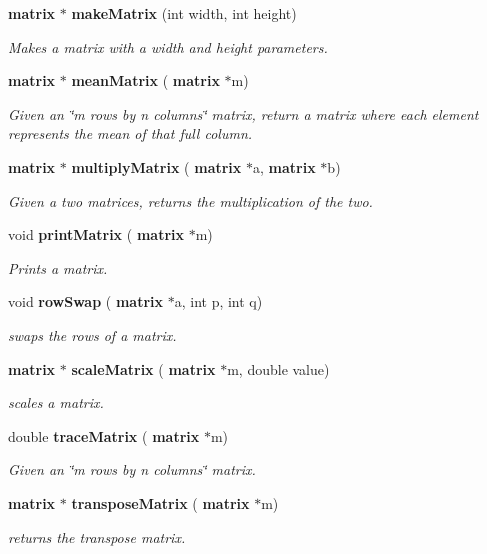 \begin{DoxyCompactItemize}
\textbf{ matrix} $\ast$ \textbf{ make\+Matrix} (int width, int height)
\begin{DoxyCompactList}\small\item\em Makes a matrix with a width and height parameters. \end{DoxyCompactList}\item 
\textbf{ matrix} $\ast$ \textbf{ mean\+Matrix} (\textbf{ matrix} $\ast$m)
\begin{DoxyCompactList}\small\item\em Given an \char`\"{}m rows by n columns\char`\"{} matrix, return a matrix where each element represents the mean of that full column. \end{DoxyCompactList}\item 
\textbf{ matrix} $\ast$ \textbf{ multiply\+Matrix} (\textbf{ matrix} $\ast$a, \textbf{ matrix} $\ast$b)
\begin{DoxyCompactList}\small\item\em Given a two matrices, returns the multiplication of the two. \end{DoxyCompactList}\item 
void \textbf{ print\+Matrix} (\textbf{ matrix} $\ast$m)
\begin{DoxyCompactList}\small\item\em Prints a matrix. \end{DoxyCompactList}\item 
void \textbf{ row\+Swap} (\textbf{ matrix} $\ast$a, int p, int q)
\begin{DoxyCompactList}\small\item\em swaps the rows of a matrix. \end{DoxyCompactList}\item 
\textbf{ matrix} $\ast$ \textbf{ scale\+Matrix} (\textbf{ matrix} $\ast$m, double value)
\begin{DoxyCompactList}\small\item\em scales a matrix. \end{DoxyCompactList}\item 
double \textbf{ trace\+Matrix} (\textbf{ matrix} $\ast$m)
\begin{DoxyCompactList}\small\item\em Given an \char`\"{}m rows by n columns\char`\"{} matrix. \end{DoxyCompactList}\item 
\textbf{ matrix} $\ast$ \textbf{ transpose\+Matrix} (\textbf{ matrix} $\ast$m)
\begin{DoxyCompactList}\small\item\em returns the transpose matrix. \end{DoxyCompactList}\end{DoxyCompactItemize}


